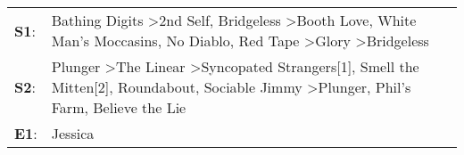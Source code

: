 \begin{supertabular}{p{0.03\textwidth}p{0.92\textwidth}}
 \textbf{S1}:  &           Bathing Digits\textsuperscript{} \textgreater \enspace 2nd Self\textsuperscript{}, \enspace Bridgeless\textsuperscript{} \textgreater \enspace Booth Love\textsuperscript{}, \enspace White Man's Moccasins\textsuperscript{}, \enspace No Diablo\textsuperscript{}, \enspace Red Tape\textsuperscript{} \textgreater \enspace Glory\textsuperscript{} \textgreater \enspace Bridgeless\textsuperscript{}  \enspace  \\
 \textbf{S2}:  &  Plunger\textsuperscript{} \textgreater \enspace The Linear\textsuperscript{} \textgreater \enspace Syncopated Strangers[1]\textsuperscript{}, \enspace Smell the Mitten[2]\textsuperscript{}, \enspace Roundabout\textsuperscript{}, \enspace Sociable Jimmy\textsuperscript{} \textgreater \enspace Plunger\textsuperscript{}, \enspace Phil's Farm\textsuperscript{}, \enspace Believe the Lie\textsuperscript{}  \enspace  \\
 \textbf{E1}:  &                                                                                                                                                                                                                                                                                                                                                                                           Jessica\textsuperscript{}  \enspace  \\
\end{supertabular}
